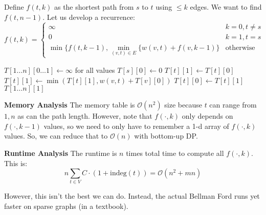 \begin{algothm} 
    Define $f(t, k)$ as the shortest path from $s$ to $t$ using $\leq k$ edges. We want to find $f(t, n - 1)$. Let us develop a recurrence:
    \[ f(t, k) = \begin{cases}
        \infty & k = 0, t \neq s \\
        0 & k = 1, t = s \\
        \min\{f(t, k - 1), \min_{(v, t) \in E}\{w(v, t) + f(v, k - 1)\} & \text{otherwise}
    \end{cases} \]

    \begin{algorithmic}
            \State $T[1 \dots n][0\dots 1] \gets \infty$ for all values
            \State $T[s][0] \gets 0$
                    $T[t][1] \gets T[t][0]$
                        \State $T[t][1] \gets \min(T[t][1], w(v, t) + T[v][0])$
                    \EndFor
                \EndFor
                    \State $T[t][0] \gets T[t][1]$
                \EndFor
            \EndFor
            \State \Return $T[1 \dots n][1]$
        \EndFunction
    \end{algorithmic}

    \textbf{Memory Analysis} The memory table is $\mathcal{O}(n^2)$ size because $t$ can range from $1, n$ as can the path length. However,
    note that $f(\cdot, k)$ only depends on $f(\cdot, k - 1)$ values, so we need to only have to remember a 1-d array of $f(\cdot, k)$ values. So,
    we can reduce that to $\mathcal{O}(n)$ with bottom-up DP.

    \textbf{Runtime Analysis} The runtime is $n$ times total time to compute all $f(\cdot, k)$. This is:
    \[ n \sum_{t \in V} C \cdot (1 + \text{indeg}(t)) = \mathcal{O}(n^2 + mn) \]
\end{algothm}

However, this isn't the best we can do. Instead, the actual Bellman Ford runs yet faster on sparse graphs (in a textbook).

